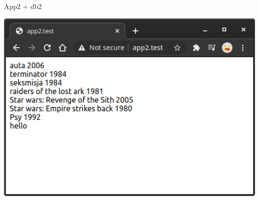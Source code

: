 \documentclass[presentation]{beamer}
\begin{document}
\begin{frame}[label={sec:orgd14dd4d}]{App2 + db2}
\begin{center}
\includegraphics[width=.9\linewidth]{./data/app/app2.png}
\end{center}
\end{frame}
\end{document}
